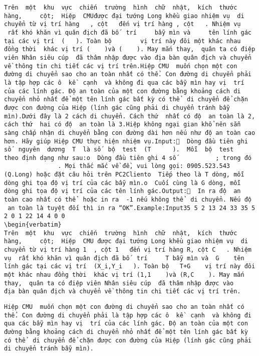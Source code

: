 
\begin{verbatim}
Trên  một  khu  vực  chiến  trường  hình  chữ  nhật,  kích  thước     hàng,     cột;  Hiệp  CMUđược đại tướng Long khều giao nhiệm vụ  di chuyển từ vị trí hàng   , cột   đến vị trí hàng , cột   . Nhiệm vụ  rất khó khăn vì quân địch đã bố  trí     bẫy mìn và     tên lính gác tại các vị trí  (   ). Toàn bộ        vị trí này đôi một khác nhau đồng thời  khác vị trí (    )và (    ). May mắn thay,  quân ta có điệp viên Nhân siêu cúp  đã thâm nhập được vào địa bàn quân địch và chuyển về thông tin chi tiết các vị trí trên.Hiệp CMU  muốn chọn một con đường di chuyển sao cho an toàn nhất có thể. Con đường di chuyển phải là tập hợp các ô  kề  cạnh  và không đi qua các bẫy mìn hay vị  trí của các lính gác. Độ an toàn của một con đường bằng khoảng cách di chuyển nhỏ nhất để một tên lính gác bất kỳ có thể  di chuyển để chặn được con đường của Hiệp (lính gác cũng phải di chuyển tránh bẫy mìn).Dưới đây là 2 cách di chuyển. Cách thứ  nhất có độ  an toàn là 2, cách thứ  hai có độ  an toàn là 3.Hiệp không ngại gian khổ nên sẵn sàng chấp nhận di chuyển bằng con đường dài hơn nếu như độ an toàn cao hơn. Hãy giúp Hiệp CMU thực hiện nhiệm vụ.Input:  Dòng đầu tiên ghi số  nguyên  dương  T  là số  bộ  test  (T      ).  Mỗi  bộ  test theo định dạng như sau:o  Dòng đầu tiên ghi 4 số           ; trong đó                . Mọi thắc mắc về đề, vui lòng gọi: 0905.523.543 (Q.Long) hoặc đặt câu hỏi trên PC2Cliento  Tiếp theo là T dòng, mỗi dòng ghi tọa độ vị trí của các bẫy mìn.o  Cuối cùng là G dòng, mỗi dòng ghi tọa độ vị trí của các tên lính gác.Output:  In ra độ  an toàn cao nhất có thể  hoặc in ra  -1 nếu không thể  di chuyển. Nếu độ  an toàn là tuyệt đối thì in ra “OK”.Example:Input35 5 2 13 24 33 35 5 2 0 1 22 14 4 0 0
\begin{verbatim}
Trên  một  khu  vực  chiến  trường  hình  chữ  nhật,  kích  thước     hàng,     cột;  Hiệp  CMU được đại tướng Long khều giao nhiệm vụ  di chuyển từ vị trí hàng 1  , cột 1   đến vị trí hàng R, cột C   . Nhiệm vụ  rất khó khăn vì quân địch đã bố  trí     T bẫy mìn và  G    tên lính gác tại các vị trí  (X_i,Y_i   ). Toàn bộ   T+G    vị trí này đôi một khác nhau đồng thời  khác vị trí (1,1    )và (R,C    ). May mắn thay,  quân ta có điệp viên Nhân siêu cúp  đã thâm nhập được vào địa bàn quân địch và chuyển về thông tin chi tiết các vị trí trên.\end{verbatim}
\begin{verbatim}
Hiệp CMU  muốn chọn một con đường di chuyển sao cho an toàn nhất có thể. Con đường di chuyển phải là tập hợp các ô  kề  cạnh  và không đi qua các bẫy mìn hay vị  trí của các lính gác. Độ an toàn của một con đường bằng khoảng cách di chuyển nhỏ nhất để một tên lính gác bất kỳ có thể  di chuyển để chặn được con đường của Hiệp (lính gác cũng phải di chuyển tránh bẫy mìn).\end{verbatim}
